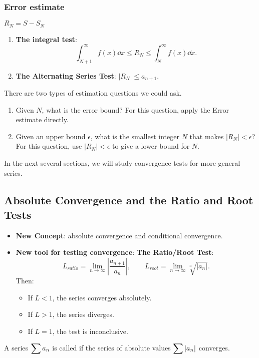 \subsubsection{Error estimate}
\begin{center}
\begin{tcolorbox}
    $R_N = S - S_N$
    \begin{enumerate}
        \item \textbf{The integral test}:
            \[\int_{N+1}^\infty f(x) \dd x \leq R_N \leq \int_{N}^\infty f(x) \dd x.\]
        \item \textbf{The Alternating Series Test}: $|R_N| \leq a_{n+1}$.
    \end{enumerate}
\end{tcolorbox}
\end{center}

There are two types of estimation questions we could ask.

\begin{enumerate}
    \item Given $N$, what is the error bound? For this question, apply the Error estimate directly.
    \item Given an upper bound $\epsilon$, what is the smallest integer $N$ that makes $|R_N| < \epsilon$? For this question, use $|R_N| < \epsilon$ to give a lower bound for $N$.
\end{enumerate}
In the next several sections, we will study convergence tests for more general series.

\subsection{Absolute Convergence and the Ratio and Root Tests}  
\begin{center}
\begin{tcolorbox}
    \begin{itemize}
        \item \textbf{New Concept}: absolute convergence and conditional convergence.
        
        \item \textbf{New tool for testing convergence}: \textbf{The Ratio/Root Test}: \[L_{ratio} = \lim_{n \to \infty} \left| \dfrac{a_{n+1}}{a_n} \right|, \qquad L_{root} = \lim_{n \to \infty} \sqrt[n]{|a_n|}.\]
        Then:
        \begin{itemize}
            \item If $L < 1$, the series converges absolutely.
            \item If $L > 1$, the series diverges.
            \item If $L = 1$, the test is inconclusive.
        \end{itemize}
    \end{itemize}
\end{tcolorbox}
\end{center}
\begin{defn}
    A series $\displaystyle\sum a_n$ is called  if the series of absolute values $\displaystyle\sum |a_n|$ converges. 
\end{defn}

